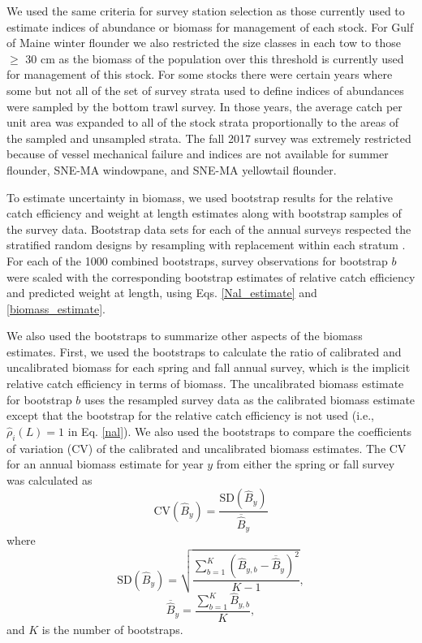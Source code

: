 \documentclass[
  12pt,
]{article}
\begin{document}
We used the same criteria for survey station selection as those
currently used to estimate indices of abundance or biomass for
management of each stock. For Gulf of Maine winter flounder we also
restricted the size classes in each tow to those \(\geq\) 30 cm as the
biomass of the population over this threshold is currently used for
management of this stock. For some stocks there were certain years where
some but not all of the set of survey strata used to define indices of
abundances were sampled by the bottom trawl survey. In those years, the
average catch per unit area was expanded to all of the stock strata
proportionally to the areas of the sampled and unsampled strata. The
fall 2017 survey was extremely restricted because of vessel mechanical
failure and indices are not available for summer flounder, SNE-MA
windowpane, and SNE-MA yellowtail flounder.

To estimate uncertainty in biomass, we used bootstrap results for the
relative catch efficiency and weight at length estimates along with
bootstrap samples of the survey data. Bootstrap data sets for each of
the annual surveys respected the stratified random designs by resampling
with replacement within each stratum \citep{smith97}. For each of the
1000 combined bootstraps, survey observations for bootstrap \(b\) were
scaled with the corresponding bootstrap estimates of relative catch
efficiency and predicted weight at length, using Eqs. \ref{Nal_estimate}
and \ref{biomass_estimate}.

We also used the bootstraps to summarize other aspects of the biomass
estimates. First, we used the bootstraps to calculate the ratio of
calibrated and uncalibrated biomass for each spring and fall annual
survey, which is the implicit relative catch efficiency in terms of
biomass. The uncalibrated biomass estimate for bootstrap \(b\) uses the
resampled survey data as the calibrated biomass estimate except that the
bootstrap for the relative catch efficiency is not used (i.e.,
\(\widehat \rho_i\left(L\right) = 1\) in Eq. \ref{nal}). We also used
the bootstraps to compare the coefficients of variation (CV) of the
calibrated and uncalibrated biomass estimates. The CV for an annual
biomass estimate for year \(y\) from either the spring or fall survey
was calculated as \[
\text{CV}\left(\widehat B_y\right) = \frac{\text{SD}\left(\widehat B_y\right)}{\overline{\widehat B}_y}
\] where \[
\text{SD}\left(\widehat B_y\right) = \sqrt{\frac{\sum_{b=1}^K \left(\widehat B_{y,b} - \overline{\widehat B}_y\right)^2}{K-1}},
\] \[
\overline{\widehat B}_y = \frac{\sum_{b=1}^K \widehat B_{y,b}}{K},
\] and \(K\) is the number of bootstraps.
\end{document}
